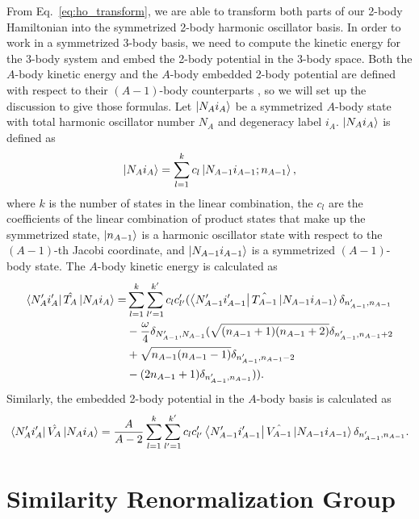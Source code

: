 From Eq.~\ref{eq:ho_transform}, we are able to transform both parts of our 2-body Hamiltonian into the symmetrized 2-body harmonic oscillator basis. In order to work in a symmetrized 3-body basis, we need to compute the kinetic energy for the 3-body system and embed the 2-body potential in the 3-body space. Both the $A$-body kinetic energy and the $A$-body embedded 2-body potential are defined with respect to their $(A-1)$-body counterparts \cite{Jurgenson:2008jp}, so we will set up the discussion to give those formulas. Let $\ket{N_A i_A}$ be a symmetrized $A$-body state with total harmonic oscillator number $N_A$ and degeneracy label $i_A$. $\ket{N_A i_A}$ is defined as
\begin{equation}
\ket{N_A i_A} = \sum_{l=1}^k c_l \ket{N_{A-1} i_{A-1}; n_{A-1}},
\end{equation}
where $k$ is the number of states in the linear combination, the $c_l$ are the coefficients of the linear combination of product states that make up the symmetrized state, $\ket{n_{A-1}}$ is a harmonic oscillator state with respect to the $(A-1)$-th Jacobi coordinate, and $\ket{N_{A-1} i_{A-1}}$ is a symmetrized $(A-1)$-body state. The $A$-body kinetic energy is calculated as
\begin{equation}
\begin{aligned}
\bra{N_A' i_A'}\hat{T_A}\ket{N_A i_A} = & \sum_{l=1}^k \sum_{l'=1}^{k'} c_l c_{l'}' (\bra{N_{A-1}' i_{A-1}'}\hat{T_{A-1}}\ket{N_{A-1} i_{A-1}}\delta_{n_{A-1}',n_{A-1}} \\ 
& - \frac{\omega}{4}\delta_{N_{A-1}',N_{A-1}}(\sqrt{(n_{A-1} + 1)(n_{A-1} + 2)}\delta_{n_{A-1}',n_{A-1} + 2} \\
& + \sqrt{n_{A-1}(n_{A-1} - 1)}\delta_{n_{A-1}',n_{A-1} - 2} \\
& - (2 n_{A-1} + 1)\delta_{n_{A-1}',n_{A-1}})).
\end{aligned}
\end{equation}
Similarly, the embedded 2-body potential in the $A$-body basis is calculated as
\begin{equation}
\bra{N_A' i_A'}\hat{V_A}\ket{N_A i_A} = \frac{A}{A-2} \sum_{l=1}^k \sum_{l'=1}^{k'} c_l c_{l'}' \bra{N_{A-1}' i_{A-1}'}\hat{V_{A-1}}\ket{N_{A-1} i_{A-1}}\delta_{n_{A-1}',n_{A-1}}.
\end{equation}

\section{Similarity Renormalization Group}

